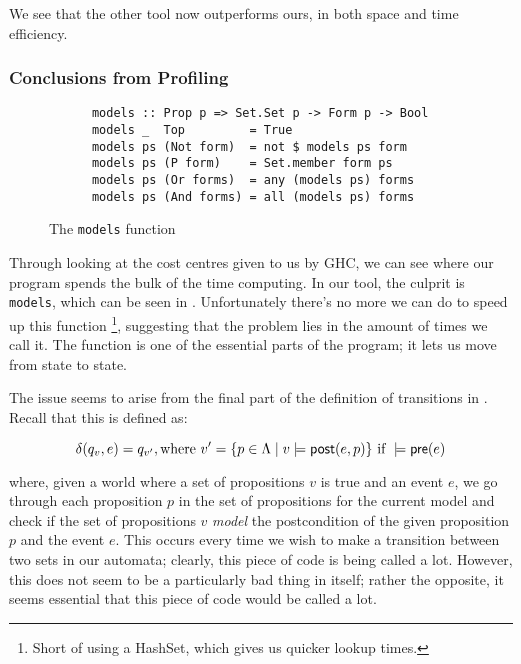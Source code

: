 \documentclass[12pt, a4paper]{article}
\begin{document}
We see that the other tool now outperforms ours, in both space and time
efficiency. 

\subsubsection{Conclusions from Profiling}

\begin{wrapfigure}{r}{0.5\textwidth}
  \begin{center}
    \begin{verbatim}
      models :: Prop p => Set.Set p -> Form p -> Bool
      models _  Top         = True
      models ps (Not form)  = not $ models ps form
      models ps (P form)    = Set.member form ps
      models ps (Or forms)  = any (models ps) forms
      models ps (And forms) = all (models ps) forms
    \end{verbatim}
  \end{center}
  \caption{The \texttt{models} function}
  \label{fig:modelsfunction}
\end{wrapfigure}



Through looking at the cost centres given to us by GHC, we can see where our
program spends the bulk of the time computing. In our tool, the culprit is
\texttt{models}, which can be seen in . Unfortunately
there's no more we can do to speed up this function \footnote{Short of using a
  HashSet, which gives us quicker lookup times.}, suggesting that the problem
lies in the amount of times we call it. The function is one of the essential
parts of the program; it lets us move from state to state.

The issue seems to arise from the final part of the definition of transitions in
\mestar. Recall that this is defined as:

\begin{equation} \label{eq:delta1}
  \delta(q_v, e) = q_{v'}, \text{where } v' = \{p \in \Lambda \mid v \models \textsf{post}(e, p)\}
  \text{ if } 
  \models \textsf{pre}(e)
\end{equation}

\noindent where, given a world where a set of propositions $v$ is true and an
event $e$, we go through each proposition $p$ in the set of propositions for the
current model and check if the set of propositions $v$ \textit{model} the postcondition
of the given proposition $p$ and the event $e$. This occurs every time we wish
to make a transition between two sets in our automata; clearly, this piece of
code is being called a lot. However, this does not seem to be a particularly bad
thing in itself; rather the opposite, it seems essential that this piece of code
would be called a lot.
\end{document}
